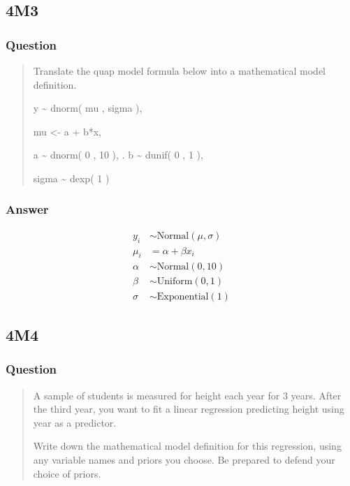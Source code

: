 \documentclass[
]{book}
\begin{document}
\hypertarget{m3-2}{%
\subsection*{4M3}\label{m3-2}}

\hypertarget{question-40}{%
\subsubsection*{Question}\label{question-40}}

\begin{quote}
Translate the quap model formula below into a mathematical model definition.

y \textasciitilde{} dnorm( mu , sigma ),

mu \textless- a + b*x,

a \textasciitilde{} dnorm( 0 , 10 ),
.
b \textasciitilde{} dunif( 0 , 1 ),

sigma \textasciitilde{} dexp( 1 )
\end{quote}

\hypertarget{answer-40}{%
\subsubsection{Answer}\label{answer-40}}

\[
\begin{aligned}
y_i &\sim \text{Normal}(\mu, \sigma) \\
\mu_i &= \alpha + \beta x_i\\
\alpha &\sim  \text{Normal}(0, 10) \\
\beta & \sim \text{Uniform}(0,1) \\
\sigma & \sim \text{Exponential}(1)
\end{aligned}
\]

\hypertarget{m4-2}{%
\subsection*{4M4}\label{m4-2}}

\hypertarget{question-41}{%
\subsubsection*{Question}\label{question-41}}

\begin{quote}
A sample of students is measured for height each year for 3 years. After the third year, you want to fit a linear regression predicting height using year as a predictor.

Write down the mathematical model definition for this regression, using any variable names and priors you choose. Be prepared to defend your choice of priors.
\end{quote}
\end{document}
